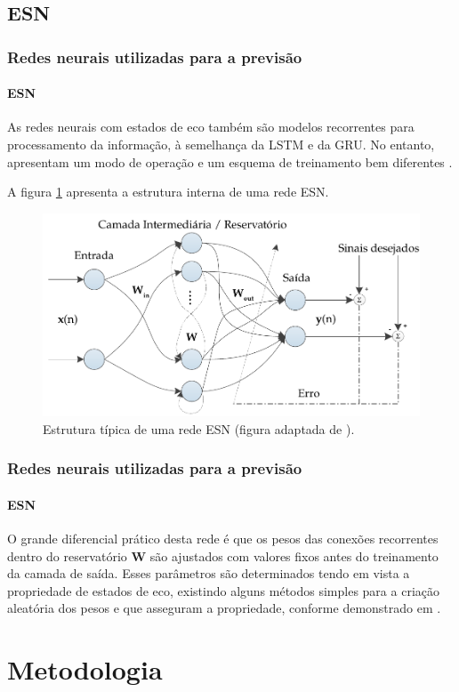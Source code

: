 \documentclass{beamer}
\begin{document}
\subsection{ESN}

\begin{frame}
\frametitle{Redes neurais utilizadas para a previsão}
\framesubtitle{ESN}
\justifying As redes neurais com estados de eco também são modelos recorrentes para processamento da informação, à semelhança da LSTM e da GRU. No entanto, apresentam um modo de operação e um esquema de treinamento bem diferentes  \cite{boccato2013novas}. 

A figura \ref{fig:esn-model} apresenta a estrutura interna de uma rede ESN.
\begin{figure}[H]
\centering
\includegraphics[scale = 0.35]{esn-network.pdf}
\caption{Estrutura típica de uma rede ESN (figura adaptada de \cite{boccato2013novas}).}
\label{fig:esn-model}
\end{figure}
\end{frame}

\begin{frame}
\frametitle{Redes neurais utilizadas para a previsão}
\framesubtitle{ESN}
\justifying O grande diferencial prático desta rede é que os pesos das conexões recorrentes dentro do reservatório $\mathbf{W}$ são ajustados com valores fixos antes do treinamento da camada de saída. Esses parâmetros são determinados tendo em vista a propriedade de estados de eco, existindo alguns métodos simples para a criação aleatória dos pesos e que asseguram a propriedade, conforme demonstrado em \cite{jaeger2007echo}. 
\end{frame}

\section{Metodologia}
\end{document}
